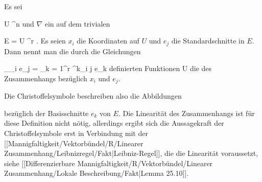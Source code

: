 
{}
{

Es sei

\mavergleichskette
{\vergleichskette
{ U
}
{ \subseteq }{ \R^n
}
{  }{
}
{    }{
}
{   }{
}
}
{}{}{}
und $\nabla$ ein
auf dem trivialen

\mavergleichskette
{\vergleichskette
{ E
}
{ = }{ U \times \R^r
}
{  }{
}
{    }{
}
{   }{
}
}
{}{}{.}
Es seien $x_i$ die Koordinaten auf $U$ und $e_j$ die Standardschnitte in $E$. Dann nennt man die durch die Gleichungen

\mavergleichskettedisp
{\vergleichskette
{ \nabla_{\partial_i } e_j
}
{ =} { \sum_{k = 1}^r \Gamma^k_{i j}  e_k
}
{ } {
}
{ } {
}
{ } {}
}
{}{}{}
definierten Funktionen
 { U } {\R
} {}
die
des Zusammenhangs bezüglich $x_i$ und $e_j$.

}

Die Christoffelsymbole beschreiben also die Abbildungen

 {  }

bezüglich der Basisschnitte $e_k$ von $E$. Die Linearität des Zusammenhangs ist für diese Definition nicht nötig, allerdings ergibt sich die Aussagekraft der Christoffelsymbole erst in Verbindung mit
der [[Mannigfaltigkeit/Vektorbündel/R/Linearer Zusammenhang/Leibnizregel/Fakt|Leibniz-Regel]],
die die Linearität voraussetzt, siehe
[[Differenzierbare Mannigfaltigkeit/R/Vektorbündel/Linearer Zusammenhang/Lokale Beschreibung/Fakt|Lemma 25.10]].

